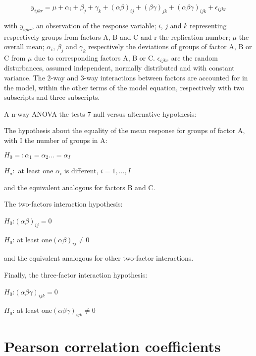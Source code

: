 \begin{equation}
y_{ijkr}=\mu + \alpha_i + \beta_j + \gamma_k +(\alpha \beta)_{ij}+(\beta \gamma)_{jk}+(\alpha \beta \gamma)_{ijk}+\epsilon_{ijkr}
\end{equation}

with $y_{ijkr}$, an observation of the response variable; $i$, $j$ and $k$ representing respectively groups from factors A, B and C and r the replication number; $\mu$ the overall mean; $\alpha_i$, $\beta_j$ and $\gamma_k$ respectively the deviations of groups of factor A, B or C from $\mu$ due to corresponding factors A, B or C. $\epsilon_{ijkr}$ are the random disturbances, assumed independent, normally distributed and with constant variance. The 2-way and 3-way interactions between factors are accounted for in the model, within the other terms of the model equation, respectively with two subscripts and three subscripts.

A n-way ANOVA the tests 7 null versus alternative hypothesis:

The hypothesis about the equality of the mean response for groups of factor A, with I the number of groups in A:

\begin{center}
$H_0=: \alpha_1=\alpha_2...=\alpha_I$

$H_a:$ at least one $\alpha_i$ is different, $i=1,...,I$
\end{center}

and the equivalent analogous for factors B and C.

The two-factors interaction hypothesis:

\begin{center}

$H_0$:$(\alpha \beta)_{ij}=0$

$H_a$: at least one$(\alpha \beta)_{ij}\neq 0$

\end{center}

and the equivalent analogous for other two-factor interactions.

Finally, the three-factor interaction hypothesis:

\begin{center}
$H_0$:$(\alpha \beta \gamma)_{ijk}=0$

$H_a$: at least one$(\alpha \beta \gamma)_{ijk}\neq 0$
\end{center}

\section{Pearson correlation coefficients}
\label{subsec:subcsectionC}

